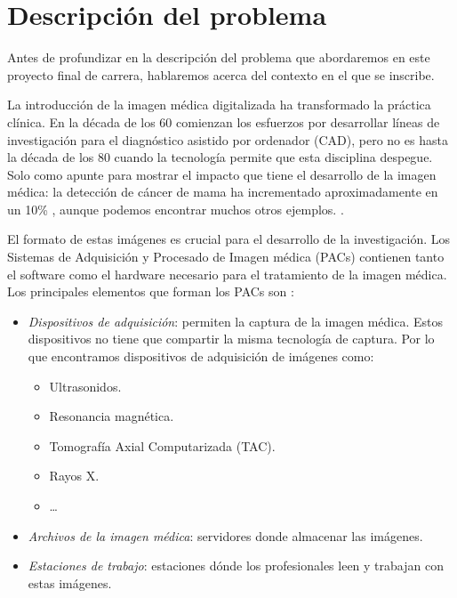 \section{Descripción del problema}\label{intro}
Antes de profundizar en la descripción del problema que abordaremos en este proyecto final de carrera, hablaremos acerca del contexto en el que se inscribe.\medskip\par

La introducción de la imagen médica digitalizada ha transformado la práctica clínica. 
En la década de los 60 \cite{journals/cmig/Doi07} comienzan los esfuerzos por desarrollar líneas de investigación para el diagnóstico asistido por ordenador (CAD), pero no es hasta la década de los 80 cuando la tecnología permite que esta disciplina despegue. Solo como apunte para mostrar el impacto que tiene  el desarrollo de la imagen médica: la detección de cáncer de mama ha incrementado aproximadamente en un 10\% \cite{journals/cmig/Nishikawa07}, aunque podemos encontrar muchos otros ejemplos. \cite{johnston1994effects, doi:10.1117/12.877968, kundel1975interpreting, Fujita:2008:CDE:1456710.1456735}.\medskip\par

El formato de estas imágenes es crucial para el desarrollo de la investigación. Los Sistemas de Adquisición y Procesado de Imagen médica (PACs) \cite{huang2010pacs} contienen tanto el software como el hardware necesario para el tratamiento de la imagen médica.  Los principales elementos que forman los PACs son \cite{pianykh2012digital}:
\begin{itemize}
	\item \textit{Dispositivos de adquisición}: permiten la captura de la imagen médica. Estos dispositivos no tiene que compartir la misma tecnología de captura. Por lo que encontramos dispositivos de adquisición de imágenes como:
	\begin{itemize}
		\item Ultrasonidos.
		\item Resonancia magnética.
		\item Tomografía Axial Computarizada (TAC).
		\item Rayos X.
		\item \ldots
	\end{itemize}
	\item \textit{Archivos de la imagen médica}: servidores donde almacenar las imágenes.
	\item \textit{Estaciones de trabajo}: estaciones dónde los profesionales leen y trabajan con estas imágenes. 
\end{itemize}

